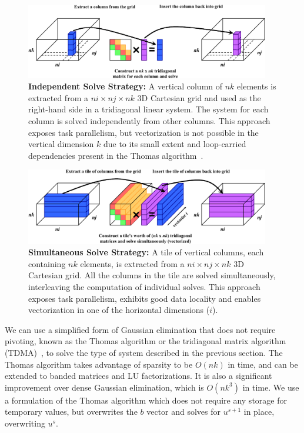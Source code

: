 \documentclass{sig-alternate}
\begin{document}
\begin{figure}[!bth]
  \centering
  \caption{
    \textbf{Independent Solve Strategy:} A vertical column of \(nk\) elements is
      extracted from a \(ni \times nj \times nk\) 3D Cartesian grid and used as
      the right-hand side in a tridiagonal linear system.
    The system for each column is solved independently from other columns.
    This approach exposes task parallelism, but vectorization is not possible
      in the vertical dimension \(k\) due to its small extent and loop-carried
      dependencies present in the Thomas algorithm~\cite{pipelined_thomas_algorithm}.
  }
  \label{fig:impl:batching:ind_strat}
  \includegraphics[width=0.95\textwidth]{figures/batching/independent_solve_diagram.pdf}
\end{figure}

\begin{figure}[!bth]
  \centering
  \caption{
    \textbf{Simultaneous Solve Strategy:} A tile of vertical columns, each 
      containing \(nk\) elements, is extracted from a \(ni \times nj \times nk\)
      3D Cartesian grid.
    All the columns in the tile are solved simultaneously, interleaving 
      the computation of individual solves.
    This approach exposes task parallelism, exhibits good data locality and
      enables vectorization in one of the horizontal dimensions (\(i\)).
  }
  \label{fig:impl:batching:sim_strat}
  \includegraphics[width=0.95\textwidth]{figures/batching/simultaneous_solve_diagram.pdf}
\end{figure}

We can use a simplified form of Gaussian elimination that does not require
  pivoting, known as the Thomas algorithm or the tridiagonal matrix algorithm
  (TDMA)~\cite{elem_numerical_analysis_conte,numerical_math_quarteroni}, to
  solve the type of system described in the previous section.
The Thomas algorithm takes advantage of sparsity to be \(O(nk)\) in time, 
  and can be extended to banded matrices and LU factorizations.
It is also a significant improvement over dense Gaussian elimination,
  which is \(O(nk^3)\) in time. 
We use a formulation of the Thomas algorithm which does not require any storage
  for temporary values, but overwrites the \(b\) vector and solves for
  \(u^{s+1}\) in place, overwriting \(u^{s}\).
\end{document}

